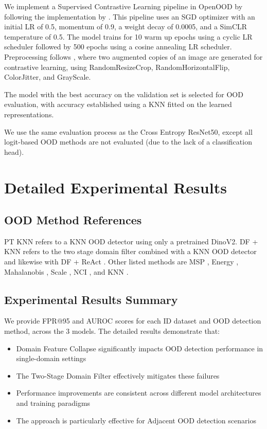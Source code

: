 We implement a Supervised Contrastive Learning pipeline in OpenOOD by following the implementation by \citet{sehwag2021ssd}. This pipeline uses an SGD optimizer with an initial LR of 0.5, momentum of 0.9, a weight decay of 0.0005, and a SimCLR temperature of 0.5. The model trains for 10 warm up epochs using a cyclic LR scheduler followed by 500 epochs using a cosine annealing LR scheduler. Preprocessing follows \citet{sehwag2021ssd}, where two augmented copies of an image are generated for contrastive learning, using RandomResizeCrop, RandomHorizontalFlip, ColorJitter, and GrayScale.

The model with the best accuracy on the validation set is selected for OOD evaluation, with accuracy established using a KNN fitted on the learned representations.

We use the same evaluation process as the Cross Entropy ResNet50, except all logit-based OOD methods are not evaluated (due to the lack of a classification head).

\section{Detailed Experimental Results}

\label{app:expresult}

\subsection{OOD Method References}

\label{app:oodref}
PT KNN refers to a KNN OOD detector \citep{sun2022out} using only a pretrained DinoV2. DF + KNN refers to the two stage domain filter combined with a KNN OOD detector \citep{sun2022out} and likewise with DF + ReAct \citep{sun2021react}. Other listed methods are MSP \citep{hendrycks2016baseline}, Energy \citep{liu2020energy}, Mahalanobis \citep{lee2018simple}, Scale \citep{xuscaling}, NCI \citep{liu2025detecting}, and KNN \citep{sun2022out}.

\subsection{Experimental Results Summary}

We provide FPR@95 and AUROC scores for each ID dataset and OOD detection method, across the 3 models. The detailed results demonstrate that:

\begin{itemize}
    \item Domain Feature Collapse significantly impacts OOD detection performance in single-domain settings
    \item The Two-Stage Domain Filter effectively mitigates these failures
    \item Performance improvements are consistent across different model architectures and training paradigms
    \item The approach is particularly effective for Adjacent OOD detection scenarios
\end{itemize}

